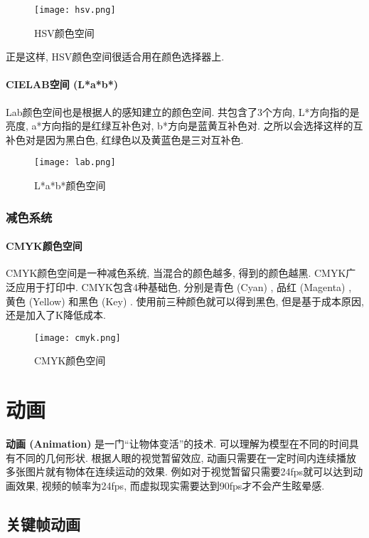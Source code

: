 \documentclass[openany]{progbookcn}
\begin{document}
\begin{figure}[H]
	\centering
	\texttt{[image: hsv.png]}
	\caption{HSV颜色空间}
	\label{fig:hsv}
\end{figure}
正是这样, HSV颜色空间很适合用在颜色选择器上. 

\subsubsection{CIELAB空间 (L*a*b*) }

Lab颜色空间也是根据人的感知建立的颜色空间. 共包含了3个方向, L*方向指的是亮度, a*方向指的是红绿互补色对, b*方向是蓝黄互补色对. 之所以会选择这样的互补色对是因为黑白色, 红绿色以及黄蓝色是三对互补色. 

\begin{figure}[H]
	\centering
	\texttt{[image: lab.png]}
	\caption{L*a*b*颜色空间}
	\label{fig:lab}
\end{figure}

\subsection{减色系统}

\subsubsection{CMYK颜色空间}

CMYK颜色空间是一种减色系统, 当混合的颜色越多, 得到的颜色越黑. CMYK广泛应用于打印中. CMYK包含4种基础色, 分别是青色 (Cyan) , 品红 (Magenta) , 黄色 (Yellow) 和黑色 (Key) . 使用前三种颜色就可以得到黑色, 但是基于成本原因, 还是加入了K降低成本. 

\begin{figure}[H]
	\centering
	\texttt{[image: cmyk.png]}
	\caption{CMYK颜色空间}
	\label{fig:cmyk}
\end{figure}

\chapter{动画}

\textbf{动画 (Animation) }是一门``让物体变活”的技术. 可以理解为模型在不同的时间具有不同的几何形状. 根据人眼的视觉暂留效应, 动画只需要在一定时间内连续播放多张图片就有物体在连续运动的效果. 例如对于视觉暂留只需要24fps就可以达到动画效果, 视频的帧率为24fps, 而虚拟现实需要达到90fps才不会产生眩晕感. 

\section{关键帧动画}
\end{document}
